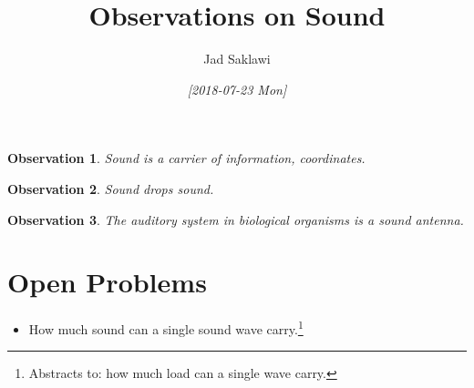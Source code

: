 \documentclass[11pt]{article}
\author{Jad Saklawi}
\date{\textit{[2018-07-23 Mon]}}
\title{Observations on Sound}
\begin{document}
\maketitle
\newtheorem*{observation}{Observation}



\begin{observation}
Sound is a carrier of information, coordinates.
\end{observation}

\begin{observation}
Sound drops sound.
\end{observation}

\begin{observation}
The auditory system in biological organisms is a sound antenna.
\end{observation}


\newpage
\appendix

\section{Open Problems}
\label{sec:org43712c4}
\begin{itemize}
\item How much sound can a single sound wave carry.\footnote{Abstracts to: how much load can a single wave carry.}
\end{itemize}


\end{document}
